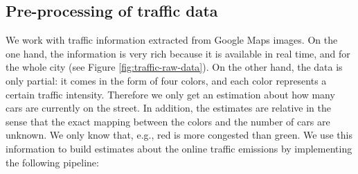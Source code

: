 \documentclass[11pt,a4paper,twoside]{article}
\theoremstyle{definition}
\numberwithin{equation}{section}
\newcommand{\<}{\langle}
\renewcommand{\>}{\rangle}
\newcommand{\asmodif}[2]{{\color{teal} #1} {\sout{#2}}}
\begin{document}
\subsection{Pre-processing of traffic data}
\label{sec:traffic-preprocess}
\asmodif{
We work with traffic information extracted from Google Maps images. On the one hand, the information is very rich because it is available in real time, and for the whole city (see Figure \ref{fig:traffic-raw-data}). On the other hand, the data is only partial: it comes in the form of four colors, and each color represents a certain traffic intensity. Therefore we only get an estimation about how many cars are currently on the street. In addition, the estimates are relative in the sense that the exact mapping between the colors and the number of cars are unknown. We only know that, e.g., red is more congested than green. We use this information to build estimates about the online traffic emissions by implementing the following pipeline:
}{}
\end{document}
